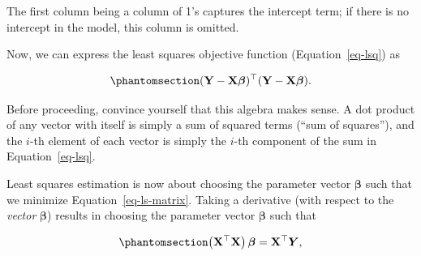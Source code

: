 \documentclass[
  letterpaper,
  DIV=11,
  numbers=noendperiod]{scrreprt}
\theoremstyle{definition}
\theoremstyle{plain}
\theoremstyle{definition}
\theoremstyle{remark}
\begin{document}
\begin{tcolorbox}[enhanced jigsaw, breakable, colframe=quarto-callout-note-color-frame, titlerule=0mm, arc=.35mm, coltitle=black, opacitybacktitle=0.6, leftrule=.75mm, opacityback=0, left=2mm, toprule=.15mm, colbacktitle=quarto-callout-note-color!10!white, title=\textcolor{quarto-callout-note-color}{\faInfo}\hspace{0.5em}{Note}, bottomtitle=1mm, toptitle=1mm, rightrule=.15mm, bottomrule=.15mm, colback=white]

The first column being a column of 1's captures the intercept term; if
there is no intercept in the model, this column is omitted.

\end{tcolorbox}

Now, we can express the least squares objective function
(Equation~\ref{eq-lsq}) as

\begin{equation}\phantomsection\label{eq-ls-matrix}{(\mathbf{Y} - \mathbf{X}\boldsymbol{\beta})^\top (\mathbf{Y} - \mathbf{X} \boldsymbol{\beta}).}\end{equation}

\begin{tcolorbox}[enhanced jigsaw, breakable, colframe=quarto-callout-tip-color-frame, titlerule=0mm, arc=.35mm, coltitle=black, opacitybacktitle=0.6, leftrule=.75mm, opacityback=0, left=2mm, toprule=.15mm, colbacktitle=quarto-callout-tip-color!10!white, title=\textcolor{quarto-callout-tip-color}{\faLightbulb}\hspace{0.5em}{Tip}, bottomtitle=1mm, toptitle=1mm, rightrule=.15mm, bottomrule=.15mm, colback=white]

Before proceeding, convince yourself that this algebra makes sense. A
dot product of any vector with itself is simply a sum of squared terms
(``sum of squares''), and the \(i\)-th element of each vector is simply
the \(i\)-th component of the sum in Equation~\ref{eq-lsq}.

\end{tcolorbox}

Least squares estimation is now about choosing the parameter vector
\(\boldsymbol{\beta}\) such that we minimize
Equation~\ref{eq-ls-matrix}. Taking a derivative (with respect to the
\emph{vector} \(\boldsymbol{\beta}\)) results in choosing the parameter
vector \(\boldsymbol{\beta}\) such that

\begin{equation}\phantomsection\label{eq-norm-eq}{\left(\mathbf{X}^\top \mathbf{X}\right) \boldsymbol{\beta} = \mathbf{X}^\top \boldsymbol{Y},}\end{equation}
\end{document}
